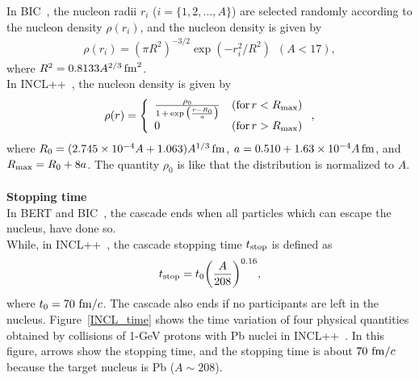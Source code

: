 \hs
In BIC~\cite{Geant4}, the nucleon radii $r_{i}$ ($i = \{1,2,...,A\}$) are selected randomly according to the nucleon density $\rho(r_{i})$, and the nucleon density is given by
\begin{eqnarray}
	\rho(r_{i}) = (\pi R^{2})^{-3/2}\exp(-r_{i}^{2}/R^{2})\,\,\,(A < 17),
\end{eqnarray}
where $R^{2}=0.8133A^{2/3}\,{\rm fm}^{2}$.\\
\hs
In INCL++~\cite{2002Boudard}, the nucleon density is given by
\begin{eqnarray}
	\rho(r) = \left\{
	\begin{array}{ll}
		{\rho_{0} \over 1\,+\,\exp\big({r - R_{0} \over a}\big)} & ({\rm for}\,r < R_{\rm max}) \\
		0                                                        & ({\rm for}\,r > R_{\rm max})
	\end{array} \right. ,
\end{eqnarray}
where $R_{0} = (2.745 \times 10^{-4}A + 1.063)A^{1/3}\,{\rm fm}$, $a = 0.510 + 1.63 \times 10^{-4}A\,{\rm fm}$, and $R_{\rm max} = R_{0} + 8a$.
The quantity $\rho_{0}$ is like that the distribution is normalized to $A$.\\
\\
\textbf{Stopping time}\\
\hs
In BERT and BIC~\cite{Geant4}, the cascade ends when all particles which can escape the nucleus, have done so.\\
\hs
While, in INCL++~\cite{Geant4}, the cascade stopping time $t_{\rm stop}$ is defined as
\begin{eqnarray}
	t_{\rm stop} = t_{0}\bigg({A \over 208}\bigg)^{0.16},
\end{eqnarray}
where $t_{0}=70~{\rm fm}/c$.
The cascade also ends if no participants are left in the nucleus.
Figure~\ref{INCL_time} shows the time variation of four physical quantities obtained by collisions of 1-GeV protons with Pb nuclei in INCL++~\cite{2002Boudard}.
In this figure, arrows show the stopping time, and the stopping time is about $70~{\rm fm}/c$ because the target nucleus is Pb ($A \sim 208$).

